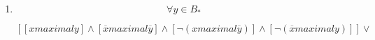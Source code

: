 \documentclass[
]{article}
\providecommand{\tightlist}{%
  \setlength{\itemsep}{0pt}\setlength{\parskip}{0pt}}
\begin{document}
\begin{enumerate}
\begin{enumerate}
\begin{enumerate}
\begin{enumerate}
        \begin{enumerate}
        \def\labelenumv{\arabic{enumv}.}
        \item
          \[\exists{x \in B}x\mathsf{\mathit{maximal}}y\]
        \item
          \[{x \in \mathit{Htom}}{{{(B)} \land y} \notin \mathit{Htom}}{(B)}\Rightarrow{x \neq y}\]

          \begin{enumerate}
          \def\labelenumvi{\arabic{enumvi}.}
          \item
            Supongamos \[\overline{x}\mathsf{\mathit{maximal}}y\]

            \begin{enumerate}
            \def\labelenumvii{\arabic{enumvii}.}
            \tightlist
            \item
              \[{\overline{x} + y} = \overline{x}\]
            \item
              \[{{y = {{({\overline{x} + y})} \cdot {({x + y})}}} = {\overline{x} \cdot x}} = 0\]
            \end{enumerate}
          \item
            Supongamos\[y \neq 0\]

            \begin{enumerate}
            \def\labelenumvii{\arabic{enumvii}.}
            \tightlist
            \item
              \[\neg{({\overline{x}{\mathsf{\mathit{maximal}}y}})}\]
            \item
              \[{\overline{x} + y} = 1\]
            \item
              \[{x \cdot \overline{y}} = 0\]
            \item
              \[\overline{x}\mathsf{\mathit{maximal}}\overline{y}\]
            \end{enumerate}
          \end{enumerate}
        \end{enumerate}
      \item
        \[\forall{y \in B_{\ast}}\]

        \[\left\lbrack {{{\left\lbrack {x\mathsf{\mathit{maximal}}y} \right\rbrack \land \left\lbrack {\overline{x}\mathsf{\mathit{maximal}}\overline{y}} \right\rbrack} \land \left\lbrack {\neg{({x\mathsf{\mathit{maximal}}\overline{y}})}} \right\rbrack} \land \left\lbrack {\neg{({\overline{x}\mathsf{\mathit{maximal}}y})}} \right\rbrack} \right\rbrack \vee\]


\end{enumerate}
\end{enumerate}
\end{enumerate}
\end{enumerate}
\end{document}
